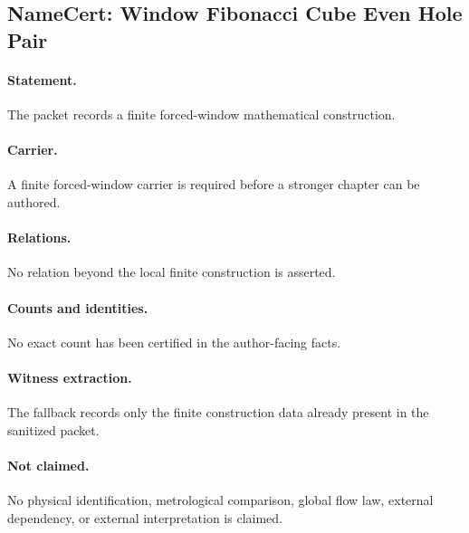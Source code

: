 \subsection{NameCert: Window Fibonacci Cube Even Hole Pair}
\label{sec:namecert-window_fibonacci_cube_even_hole_pair_certificate}

\paragraph{Statement.} The packet records a finite forced-window mathematical construction.

\paragraph{Carrier.} A finite forced-window carrier is required before a stronger chapter can be authored.

\paragraph{Relations.} No relation beyond the local finite construction is asserted.

\paragraph{Counts and identities.} No exact count has been certified in the author-facing facts.

\paragraph{Witness extraction.} The fallback records only the finite construction data already present in the sanitized packet.

\paragraph{Not claimed.} No physical identification, metrological comparison, global flow law, external dependency, or external interpretation is claimed.

